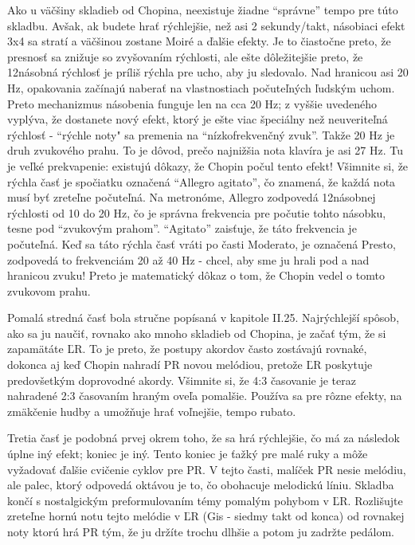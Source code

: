 Ako u väčšiny skladieb od Chopina, neexistuje žiadne “správne” tempo pre túto skladbu. Avšak, ak budete hrať rýchlejšie, než asi 2 sekundy/takt, násobiaci efekt 3x4 sa stratí a väčšinou zostane Moiré a ďalšie efekty. Je to čiastočne preto, že presnosť sa znižuje so zvyšovaním rýchlosti, ale ešte dôležitejšie preto, že 12násobná rýchlosť je príliš rýchla pre ucho, aby ju sledovalo. Nad hranicou asi 20 Hz, opakovania začínajú naberať na vlastnostiach počuteľných  ľudským uchom. Preto mechanizmus násobenia funguje len na cca 20 Hz; z vyššie uvedeného vyplýva, že dostanete nový efekt, ktorý je ešte viac špeciálny než neuveriteľná rýchlosť - “rýchle noty"  sa premenia na “nízkofrekvenčný zvuk”. Takže 20 Hz je druh zvukového prahu. To je dôvod, prečo najnižšia nota klavíra je asi 27 Hz. Tu je veľké prekvapenie: existujú dôkazy, že Chopin počul tento efekt! Všimnite si, že rýchla časť je spočiatku označená “Allegro agitato”, čo znamená, že každá nota musí byť zreteľne počuteľná. Na metronóme, Allegro zodpovedá 12násobnej rýchlosti od 10 do 20 Hz, čo je správna frekvencia pre počutie tohto násobku, tesne pod “zvukovým prahom”. “Agitato” zaisťuje, že táto frekvencia je počuteľná. Keď sa táto rýchla časť vráti po časti Moderato, je označená Presto, zodpovedá to frekvenciám 20 až 40 Hz - chcel, aby sme ju hrali pod a nad hranicou zvuku! Preto je matematický dôkaz o tom, že Chopin vedel o tomto zvukovom prahu.

Pomalá stredná časť bola stručne popísaná v kapitole II.25. Najrýchlejší spôsob, ako sa ju naučiť, rovnako ako mnoho skladieb od Chopina, je začať tým, že si zapamätáte ĽR. To je preto, že postupy akordov často zostávajú rovnaké, dokonca aj keď Chopin nahradí PR novou melódiou, pretože ĽR poskytuje predovšetkým doprovodné akordy. Všimnite si, že 4:3 časovanie je teraz nahradené 2:3 časovaním hraným oveľa pomalšie. Používa sa pre rôzne efekty, na zmäkčenie hudby a umožňuje hrať voľnejšie, tempo rubato.

Tretia časť je podobná prvej okrem toho, že sa hrá rýchlejšie, čo má za následok úplne iný efekt; koniec je iný. Tento koniec je ťažký pre malé ruky a môže vyžadovať ďalšie cvičenie cyklov pre PR. V tejto časti, malíček PR nesie melódiu, ale palec, ktorý odpovedá oktávou je to, čo obohacuje melodickú líniu. Skladba končí s nostalgickým preformulovaním témy pomalým pohybom v ĽR. Rozlišujte zreteľne hornú notu tejto melódie v ĽR (Gis - siedmy takt od konca) od rovnakej noty ktorú hrá PR tým, že ju držíte trochu dlhšie a potom ju zadržte pedálom.

